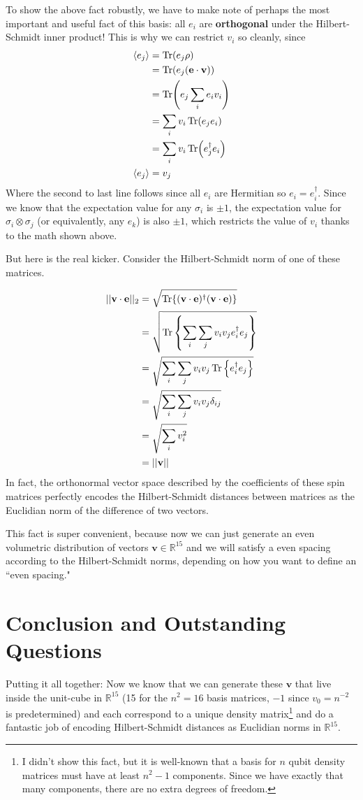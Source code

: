 \documentclass{paper}[11pt]
\newcommand{\bv}[1]{\textbf{#1}}
\begin{document}
	To show the above fact robustly, we have to make note of perhaps the most important and useful fact of this basis: all $e_i$ are \textbf{orthogonal} under the Hilbert-Schmidt inner product! This is why we can restrict $v_i$ so cleanly, since
	\begin{align*}
		\langle e_j\rangle &= \Tr(e_j\rho) \\
		&= \Tr(e_j(\bv{e}\cdot\bv{v})) \\
		&= \Tr(e_j\sum_i e_iv_i) \\
		&= \sum_i v_i\Tr(e_je_i) \\
		&= \sum_i v_i\Tr(e_j^\dagger e_i) \\
		\langle e_j\rangle &= v_j
	\end{align*}
	Where the second to last line follows since all $e_i$ are Hermitian so $e_i = e_i^\dagger$. Since we know that the expectation value for any $\sigma_i$ is $\pm 1$, the expectation value for $\sigma_i\otimes\sigma_j$ (or equivalently, any $e_k$) is also $\pm 1$, which restricts the value of $v_i$ thanks to the math shown above.
	
	But here is the real kicker. Consider the Hilbert-Schmidt norm of one of these matrices.
	
	\begin{align*}
		||\bv{v}\cdot\bv{e}||_2 &= \sqrt{\Tr\{(\bv{v}\cdot\bv{e})^\dagger(\bv{v}\cdot\bv{e})\}} \\
		&= \sqrt{\Tr\left\{\sum_i\sum_j v_iv_je_i^\dagger e_j \right\}} \\
		&= \sqrt{\sum_i\sum_j v_iv_j \Tr\left\{e_i^\dagger e_j \right\}} \\
		&= \sqrt{\sum_i\sum_j v_iv_j \delta_{ij}} \\
		&= \sqrt{\sum_i v_i^2} \\
		&= ||\bv{v}||
	\end{align*}
	In fact, the orthonormal vector space described by the coefficients of these spin matrices perfectly encodes the Hilbert-Schmidt distances between matrices as the Euclidian norm of the difference of two vectors.
	
	This fact is super convenient, because now we can just generate an even volumetric distribution of vectors $\bv{v}\in\mathbb{R}^{15}$ and we will satisfy a even spacing according to the Hilbert-Schmidt norms, depending on how you want to define an ``even spacing."
	
	\section*{Conclusion and Outstanding Questions}
	Putting it all together: Now we know that we can generate these $\bv{v}$ that live inside the unit-cube in $\mathbb{R}^{15}$ (15 for the $n^2=16$ basis matrices, $-1$ since $v_0=n^{-2}$ is predetermined) and each correspond to a unique density matrix\footnote{I didn't show this fact, but it is well-known that a basis for $n$ qubit density matrices must have at least $n^2-1$ components. Since we have exactly that many components, there are no extra degrees of freedom.} and do a fantastic job of encoding Hilbert-Schmidt distances as Euclidian norms in $\mathbb{R}^{15}$.
	
\end{document}

